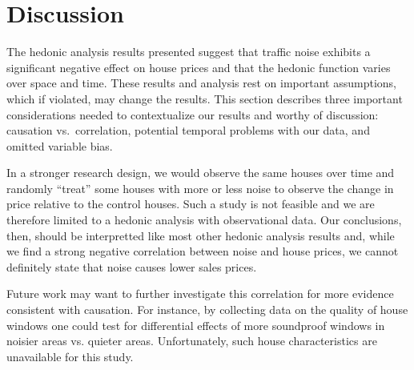 \documentclass{article}\usepackage{graphicx, color}
\begin{document}
\section{Discussion}\label{Discussion}

The hedonic analysis results presented suggest that traffic noise exhibits a significant negative effect on house prices and that the hedonic function varies over space and time. These results and analysis rest on important assumptions, which if violated, may change the results. This section describes three important considerations needed to contextualize our results and worthy of discussion: causation vs.\ correlation, potential temporal problems with our data, and omitted variable bias.

In a stronger research design, we would observe the same houses over time and randomly ``treat'' some houses with more or less noise to observe the change in price relative to the control houses. Such a study is not feasible and we are therefore limited to a hedonic analysis with observational data. Our conclusions, then, should be interpretted like most other hedonic analysis results and, while we find a strong negative correlation between noise and house prices, we cannot definitely state that noise causes lower sales prices. 

Future work may want to further investigate this correlation for more evidence consistent with causation. For instance, by collecting data on the quality of house windows one could test for differential effects of more soundproof windows in noisier areas vs. quieter areas. Unfortunately, such house characteristics are unavailable for this study.
\end{document}
